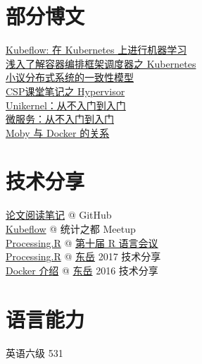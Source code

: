 \documentclass[]{deedy-resume-openfont}
\begin{document}
\begin{minipage}[t]{0.3\textwidth}
\section{部分博文}
\sectionsep
\href{http://gaocegege.com/Blog/ml%20system/kubeflow}{Kubeflow: 在 Kubernetes 上进行机器学习} \\
\href{http://gaocegege.com/Blog/%E6%BA%90%E7%A0%81%E5%88%86%E6%9E%90/kubernetes-scheduler}{浅入了解容器编排框架调度器之 Kubernetes} \\
\href{http://gaocegege.com/Blog/%E9%9A%8F%E7%AC%94/consistency}{小议分布式系统的一致性模型} \\
\href{http://gaocegege.com/Blog/csp/xen-kvm}{CSP课堂笔记之 Hypervisor} \\
\href{http://gaocegege.com/Blog/%E5%AE%89%E5%88%A9/unikernel-book}{Unikernel：从不入门到入门} \\
\href{http://gaocegege.com/Blog/%E5%AE%89%E5%88%A9/micro-services}{微服务：从不入门到入门} \\
\href{http://gaocegege.com/Blog/moby/moby}{Moby 与 Docker 的关系
} \\
\sectionsep

\section{技术分享}
\sectionsep
\href{https://github.com/gaocegege/papers-notebook}{论文阅读笔记} @ GitHub \\
\href{https://docs.google.com/presentation/d/1ED24TCnlBVzyJz0aCEAtXQQh0_W1RKSeapP3QZ0fTKA/edit?usp=sharing}{Kubeflow} @ 统计之都 Meetup \\
\href{http://slides.com/gaocegege/processing-r}{Processing.R} @ \href{http://china-r.org/sh2017/index.html}{第十届 R 语言会议} \\
\href{https://docs.google.com/presentation/d/1ylRT4VvydWbR7SyTQzNZOLpkXtgSZJiEl5nmXY1KuJw/edit?usp=sharing}{Processing.R} @ \href{https://zhuanlan.zhihu.com/dongyue}{东岳} 2017 技术分享 \\
\href{https://docs.google.com/presentation/d/1Ru4Dm9TLoyxnJgFqvsCHrb82VT622H-zBSgAe1vJL44/edit?usp=sharing}{Docker 介绍}  @ \href{https://zhuanlan.zhihu.com/dongyue}{东岳} 2016 技术分享 \\
\sectionsep

\section{语言能力}
\sectionsep
英语六级 531 \\
\sectionsep


\end{minipage}
\end{document}
